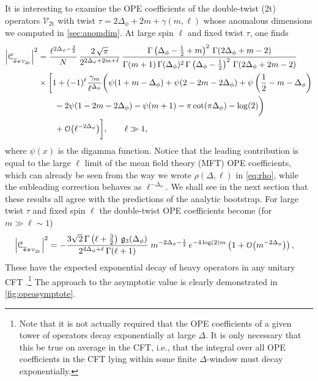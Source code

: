 \documentclass[11pt]{article}
\newcommand{\Phib}{\overline{\Phi}}
\newcommand{\cope}[1]{\mathcal{C}_{_{#1}}}
\begin{document}
It is interesting to examine the OPE coefficients of the double-twist (2t) operators $\mathcal{V}_{\mathrm{2t}}$ with twist $\tau = 2\Delta_{\phi}+2m+\gamma(m,\ell)$ whose anomalous dimensions we computed in \cref{sec:anomdim}. At large spin $\ell$ and fixed twist $\tau$, one finds
%
\begin{equation}\label{eq:largelOPE}
\begin{split}
\abs{\cope{\Phib\Phi\mathcal{V}_{\mathrm{2t}}}}^2 
&= 
  \frac{\ell^{2\Delta_{\phi}-\frac{3}{2}}}{N} \, \frac{2\, \sqrt{\pi}}{2^{2\Delta_{\phi}+2m+\ell}} \, 
  \frac{\Gamma\left(\Delta_{\phi}-\frac{1}{2}+m\right)^{2}\,  \Gamma(2\Delta_{\phi}+m-2)}{\Gamma(m+1)\, \Gamma(\Delta_{\phi})^{2}\, \Gamma\left(\Delta_{\phi}-\frac{1}{2}\right)^{2} \,\Gamma(2\Delta_{\phi}+2m-2)} \\
  &\times
   \bigg[1+(-1)^{\ell}\frac{\gamma_m}{\ell^{\Delta_{\phi}}}
   \bigg(
    \psi(1+m-\Delta_{\phi})+\psi(2-2m-2\Delta_{\phi})+\psi\left(\frac{1}{2}-m-\Delta_{\phi}\right) \\
  & \qquad 
  -2\psi(1-2m-2\Delta_{\phi})-\psi(m+1)-\pi\cot(\pi\Delta_{\phi})-\log(2)\bigg)  \\
  &\qquad 
    + \order{\ell^{-2\Delta_{\phi}} } \bigg], \qquad \ell \gg 1,
\end{split}
\end{equation}
%
where $\psi(x)$ is the digamma function. Notice that the leading contribution is equal to the large $\ell$ limit of the mean field theory (MFT) OPE coefficients, which can already be seen from the way we wrote $\rho(\Delta,\ell)$ in \eqref{eq:rho}, while the subleading correction behaves as $\ell^{-\Delta_{\phi}}$. We shall see in the next section that these results all agree with the predictions of the analytic bootstrap. For large twist $\tau$ and fixed spin $\ell$ the double-twist OPE coefficients become (for  $m \gg \ell \sim 1$)
%
\begin{equation}\label{eq:largemOPE}
\begin{split}
\abs{\cope{\Phib\Phi\mathcal{V}_{\mathrm{2t}}}}^{2} 
&= 
  -\frac{3\sqrt{2}\, \Gamma\left(\ell+\frac{3}{2}\right) \, \mathfrak{g}_{3}(\Delta_{\phi})}{2^{4\Delta_{\phi}+\ell}\, 
  \Gamma(\ell+1)} \; m^{-2\Delta_{\phi}-\frac{1}{2}}  \, e^{-4\log(2)m} 
  \left(1+\order{m^{-2\Delta_{\phi}} }\right),
\end{split}
\end{equation}
%
These have the expected exponential decay of heavy operators in any unitary CFT \cite{Pappadopulo:2012jk}.\footnote{Note that it is not actually required that the OPE coefficients of a given tower of operators decay exponentially at large $\Delta$. It is only necessary that this be true on average in the CFT, i.e., that the integral over all OPE coefficients in the CFT lying within some finite $\Delta$-window must decay exponentially.}  The approach to the asymptotic value is clearly demonstrated in \cref{fig:opeasymptote}. 
\end{document}
